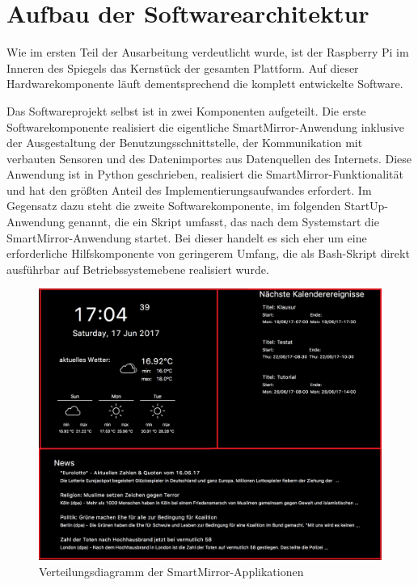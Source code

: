 \section{Aufbau der Softwarearchitektur}
Wie im ersten Teil der Ausarbeitung verdeutlicht wurde, ist der Raspberry Pi im Inneren des Spiegels das Kernstück der gesamten Plattform. Auf dieser Hardwarekomponente läuft dementsprechend die komplett entwickelte Software. 

Das Softwareprojekt selbst ist in zwei Komponenten aufgeteilt. Die erste Softwarekomponente realisiert die eigentliche SmartMirror-Anwendung inklusive der Ausgestaltung der Benutzungsschnittstelle, der Kommunikation mit verbauten Sensoren und des Datenimportes aus Datenquellen des Internets. Diese Anwendung ist in Python geschrieben, realisiert die SmartMirror-Funktionalität und hat den größten Anteil des Implementierungsaufwandes erfordert. Im Gegensatz dazu steht die zweite Softwarekomponente, im folgenden StartUp-Anwendung genannt, die ein Skript umfasst, das nach dem Systemstart die SmartMirror-Anwendung startet. Bei dieser handelt es sich eher um eine erforderliche Hilfskomponente von geringerem Umfang, die als Bash-Skript direkt ausführbar auf Betriebssystemebene realisiert wurde.  

\begin{figure}
	\centering
	\includegraphics[width=0.7\linewidth]{bilder/grafOberflaeche}
	\caption[Verteilungsdiagramm der SmartMirror-Applikationen]{Verteilungsdiagramm der SmartMirror-Applikationen}
	\label{fig:verteilungsdiagramm}
\end{figure}

